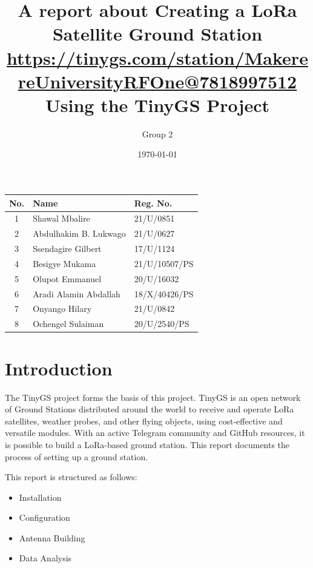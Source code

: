 \documentclass[12pt,a4paper]{article}
\title{
    A report about Creating a LoRa Satellite Ground Station  \\
    \vspace{0.5cm}
    \small{
        \href{https://tinygs.com/station/MakerereUniversityRFOne@7818997512}{https://tinygs.com/station/MakerereUniversityRFOne@7818997512}
    } \\
    \vspace{0.5cm}
    \large Using the TinyGS Project \\
}
\author{Group 2}
\date{\today}
\begin{document}
\maketitle

\begin{center}
    \renewcommand{\arraystretch}{1.5} 
    \begin{tabular}{|c|l|l|}
        \hline
        \textbf{No.} & \textbf{Name} & \textbf{Reg. No.} \\
        \hline
        1 & Shawal Mbalire & 21/U/0851 \\
        \hline
        2 & Abdulhakim B. Lukwago & 21/U/0627 \\
        \hline
        3 & Ssendagire Gilbert & 17/U/1124 \\
        \hline
        4 & Besigye Mukama & 21/U/10507/PS \\
        \hline
        5 & Olupot Emmanuel & 20/U/16032 \\
        \hline
        6 & Aradi Alamin Abdallah & 18/X/40426/PS \\
        \hline
        7&Onyango Hilary &21/U/0842 \\
        \hline
        8 & Ochengel Sulaiman & 20/U/2540/PS \\
        \hline
    \end{tabular}
\end{center}



\section{Introduction}
The TinyGS project \cite{tinygs} forms the basis of this project. TinyGS is an open network of Ground Stations distributed around the world to receive and operate LoRa satellites, weather probes, and other flying objects, using cost-effective and versatile modules. With an active Telegram community and GitHub resources, it is possible to build a LoRa-based ground station. This report documents the process of setting up a ground station.

This report is structured as follows:
\begin{itemize}
    \item Installation
    \item Configuration
    \item Antenna Building
    \item Data Analysis
\end{itemize}
\end{document}
